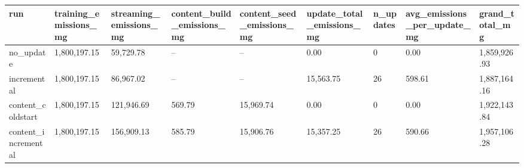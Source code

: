 \begin{tabular}{lllllllll}
\toprule
run & training_emissions_mg & streaming_emissions_mg & content_build_emissions_mg & content_seed_emissions_mg & update_total_emissions_mg & n_updates & avg_emissions_per_update_mg & grand_total_mg \\
\midrule
no_update & 1,800,197.15 & 59,729.78 & -- & -- & 0.00 & 0 & 0.00 & 1,859,926.93 \\
incremental & 1,800,197.15 & 86,967.02 & -- & -- & 15,563.75 & 26 & 598.61 & 1,887,164.16 \\
content_coldstart & 1,800,197.15 & 121,946.69 & 569.79 & 15,969.74 & 0.00 & 0 & 0.00 & 1,922,143.84 \\
content_incremental & 1,800,197.15 & 156,909.13 & 585.79 & 15,906.76 & 15,357.25 & 26 & 590.66 & 1,957,106.28 \\
\bottomrule
\end{tabular}
